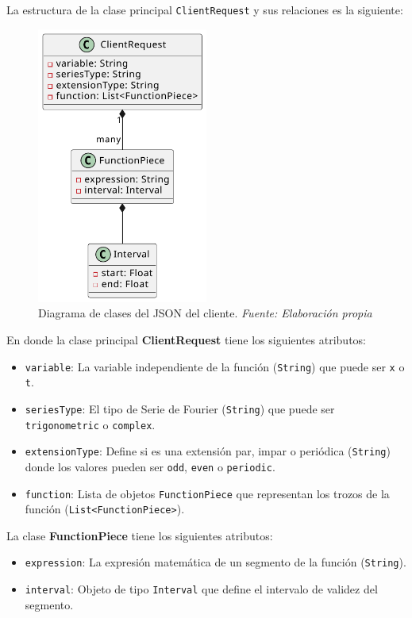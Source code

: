 La estructura de la clase principal \texttt{ClientRequest} y sus relaciones es la siguiente:

\begin{figure}[H]
	\centering
	\includegraphics[width=0.5\textwidth]{img/chapter04/DC_JSON_Client.pdf}
	\caption[Diagrama de clases del JSON del cliente.]{Diagrama de clases del JSON del cliente. \textit{Fuente: \textit{Elaboración propia}}}
	\label{fig:Diagrama_clase_cliente}
\end{figure}


En donde la clase principal \textbf{ClientRequest} tiene los siguientes atributos:
\begin{itemize}
	\item \texttt{variable}: La variable independiente de la función (\texttt{String}) que puede ser \texttt{x} o  \texttt{t}.
	\item \texttt{seriesType}: El tipo de Serie de Fourier (\texttt{String}) que puede ser \texttt{trigonometric} o \texttt{complex}.
	\item \texttt{extensionType}: Define si es una extensión par, impar o periódica (\texttt{String}) donde los valores pueden ser \texttt{odd}, \texttt{even} o \texttt{periodic}.
	\item \texttt{function}: Lista de objetos \texttt{FunctionPiece} que representan los trozos de la función (\texttt{List<FunctionPiece>}).
\end{itemize}

	
La clase \textbf{FunctionPiece} tiene los siguientes atributos: 
\begin{itemize}
	\item \texttt{expression}: La expresión matemática de un segmento de la función (\texttt{String}).
	\item \texttt{interval}: Objeto de tipo \texttt{Interval} que define el intervalo de validez del segmento.
\end{itemize}

